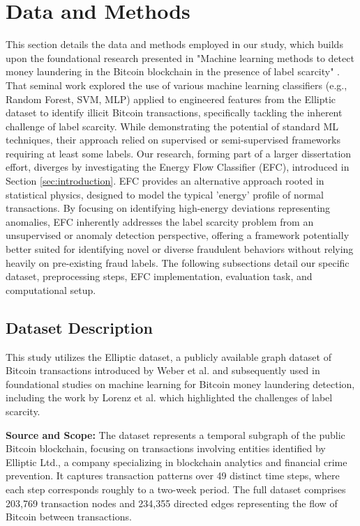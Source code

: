 \documentclass[12pt]{article}
\begin{document}
\section{Data and Methods} \label{sec:methods}
This section details the data and methods employed in our study, which builds upon the foundational research presented in
"Machine learning methods to detect money laundering in the Bitcoin blockchain in the presence of label scarcity"
\cite{lorenz2021machinelearningmethodsdetect}. That seminal work explored the use of various machine learning classifiers
(e.g., Random Forest, SVM, MLP) applied to engineered features from the Elliptic dataset to identify illicit Bitcoin transactions,
specifically tackling the inherent challenge of label scarcity. While demonstrating the potential of standard ML techniques,
their approach relied on supervised or semi-supervised frameworks requiring at least some labels. Our research, forming
part of a larger dissertation effort, diverges by investigating the Energy Flow Classifier (EFC), introduced in Section
\ref{sec:introduction}. EFC provides an alternative approach rooted in statistical physics, designed to model the typical
'energy' profile of normal transactions. By focusing on identifying high-energy deviations representing anomalies, EFC
inherently addresses the label scarcity problem from an unsupervised or anomaly detection perspective, offering a framework
potentially better suited for identifying novel or diverse fraudulent behaviors without relying heavily on pre-existing
fraud labels. The following subsections detail our specific dataset, preprocessing steps, EFC implementation, evaluation
task, and computational setup.

\subsection{Dataset Description} \label{subsec:dataset}

This study utilizes the Elliptic dataset, a publicly available graph dataset of Bitcoin transactions introduced by Weber
et al. \cite{weber2019antimoneylaunderingbitcoinexperimenting} and subsequently used in foundational studies on machine
learning for Bitcoin money laundering detection, including the work by Lorenz et al. \cite{lorenz2021machinelearningmethodsdetect}
which highlighted the challenges of label scarcity.

\textbf{Source and Scope:} The dataset represents a temporal subgraph of the public Bitcoin blockchain, focusing on transactions
involving entities identified by Elliptic Ltd., a company specializing in blockchain analytics and financial crime prevention.
It captures transaction patterns over 49 distinct time steps, where each step corresponds roughly to a two-week period.
The full dataset comprises 203,769 transaction nodes and 234,355 directed edges representing the flow of Bitcoin between
transactions.
\end{document}
